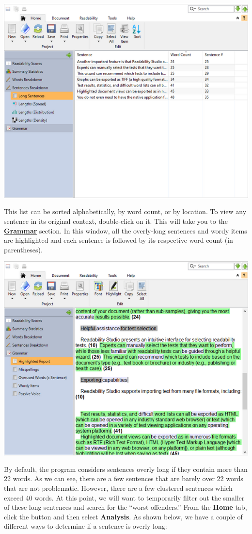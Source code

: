 \documentclass[
]{book}
\theoremstyle{definition}
\theoremstyle{definition}
\theoremstyle{definition}
\theoremstyle{definition}
\theoremstyle{remark}
\begin{document}
\includegraphics{Images/featuressentencelist.png}

This list can be sorted alphabetically, by word count, or by location. To view any sentence in its original context, double-click on it. This will take you to the \protect\hyperlink{reviewing-standard-grammar}{\textbf{Grammar}} section. In this window, all the overly-long sentences and wordy items are highlighted and each sentence is followed by its respective word count (in parentheses).

\includegraphics{Images/featuressentences.png}

By default, the program considers sentences overly long if they contain more than 22 words. As we can see, there are a few sentences that are barely over 22 words that are not problematic. However, there are a few clustered sentences which exceed 40 words. At this point, we will want to temporarily filter out the smaller of these long sentences and search for the ``worst offenders.'' From the \textbf{Home} tab, click the  button and then select \textbf{Analysis}. As shown below, we have a couple of different ways to determine if a sentence is overly long:
\end{document}
